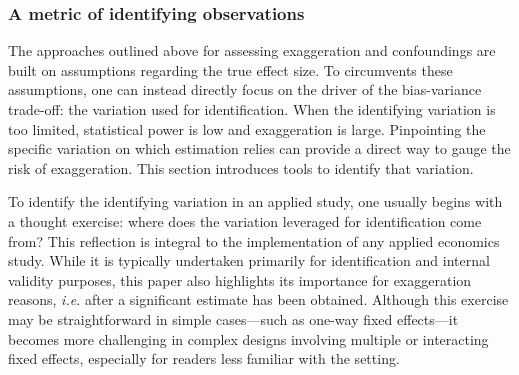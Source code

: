 \documentclass[usletter, 12pt]{article}
\begin{document}
			\subsubsection{A metric of identifying observations}
				
				
				
				The approaches outlined above for assessing exaggeration and confoundings are built on assumptions regarding the true effect size. To circumvents these assumptions, one can instead directly focus on the driver of the bias-variance trade-off: the variation used for identification. When the identifying variation is too limited, statistical power is low and exaggeration is large. Pinpointing the specific variation on which estimation relies can provide a direct way to gauge the risk of exaggeration. This section introduces tools to identify that variation.
			
				To identify the identifying variation in an applied study, one usually begins with a thought exercise: where does the variation leveraged for identification come from? This reflection is integral to the implementation of any applied economics study. While it is typically undertaken primarily for identification and internal validity purposes, this paper also highlights its importance for exaggeration reasons, \textit{i.e.} after a significant estimate has been obtained. Although this exercise may be straightforward in simple cases---such as one-way fixed effects---it becomes more challenging in complex designs involving multiple or interacting fixed effects, especially for readers less familiar with the setting.
			
\end{document}
